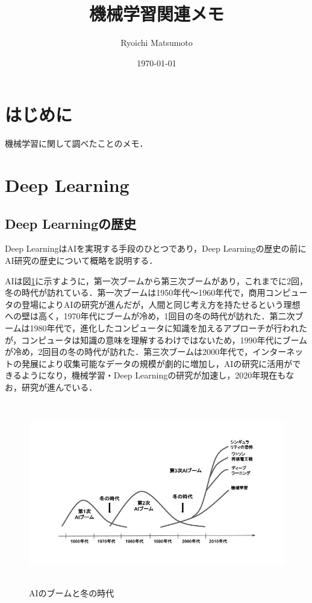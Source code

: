 \documentclass[11pt,a4paper]{jsarticle}
\title{機械学習関連メモ}
\author{Ryoichi Matsumoto}
\date{\today}
\begin{document}
\maketitle
%
%
\tableofcontents
\listoftables
\listoffigures
%
%

\section{はじめに}
機械学習に関して調べたことのメモ．

\section{Deep Learning}

\subsection{Deep Learningの歴史}

Deep LearningはAIを実現する手段のひとつであり，Deep Learningの歴史の前にAI研究の歴史について概略を説明する．\cite{dl_hist1} \cite{dl_hist2} \cite{dl_hist3}

AIは図\ref{ai_hist_jpg}に示すように，第一次ブームから第三次ブームがあり，これまでに2回，冬の時代が訪れている．第一次ブームは1950年代～1960年代で，商用コンピュータの登場によりAIの研究が進んだが，人間と同じ考え方を持たせるという理想への壁は高く，1970年代にブームが冷め，1回目の冬の時代が訪れた．第二次ブームは1980年代で，進化したコンピュータに知識を加えるアプローチが行われたが，コンピュータは知識の意味を理解するわけではないため，1990年代にブームが冷め，2回目の冬の時代が訪れた．第三次ブームは2000年代で，インターネットの発展により収集可能なデータの規模が劇的に増加し，AIの研究に活用ができるようになり，機械学習・Deep Learningの研究が加速し，2020年現在もなお，研究が進んでいる．

\begin{figure} [H]
	\begin{center}
		\includegraphics[clip, height=8cm, bb=10 0 160 104]{data/figure/ai_hist.jpg}
		\caption{AIのブームと冬の時代}
		\label{ai_hist_jpg}
	\end{center}
\end{figure}
\end{document}
